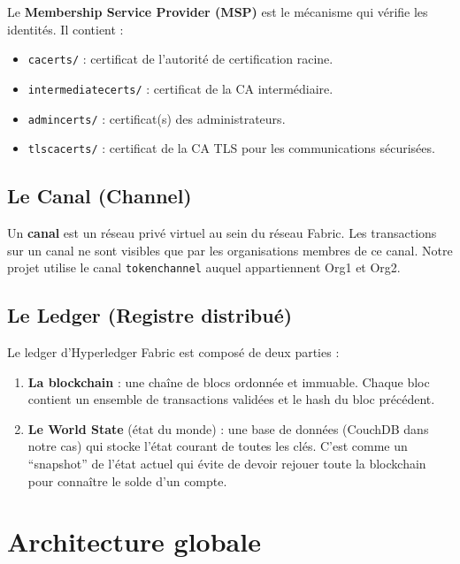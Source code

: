 \documentclass[12pt,a4paper,twoside]{report}
\begin{document}
Le \textbf{Membership Service Provider (MSP)} est le mécanisme qui vérifie les identités. Il contient :
\begin{itemize}
    \item \texttt{cacerts/} : certificat de l'autorité de certification racine.
    \item \texttt{intermediatecerts/} : certificat de la CA intermédiaire.
    \item \texttt{admincerts/} : certificat(s) des administrateurs.
    \item \texttt{tlscacerts/} : certificat de la CA TLS pour les communications sécurisées.
\end{itemize}

\subsection{Le Canal (Channel)}

Un \textbf{canal} est un réseau privé virtuel au sein du réseau Fabric. Les transactions sur un canal ne sont visibles que par les organisations membres de ce canal. Notre projet utilise le canal \texttt{tokenchannel} auquel appartiennent Org1 et Org2.

\subsection{Le Ledger (Registre distribué)}

Le ledger d'Hyperledger Fabric est composé de deux parties :
\begin{enumerate}
    \item \textbf{La blockchain} : une chaîne de blocs ordonnée et immuable. Chaque bloc contient un ensemble de transactions validées et le hash du bloc précédent.
    \item \textbf{Le World State} (état du monde) : une base de données (CouchDB dans notre cas) qui stocke l'état courant de toutes les clés. C'est comme un ``snapshot'' de l'état actuel qui évite de devoir rejouer toute la blockchain pour connaître le solde d'un compte.
\end{enumerate}

\section{Architecture globale}
\end{document}
